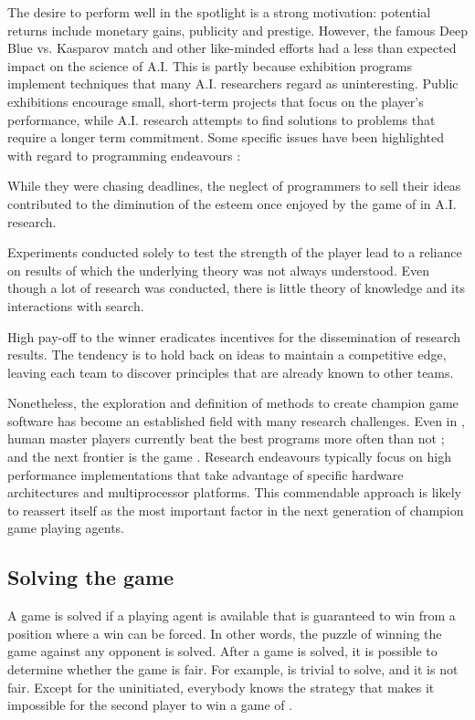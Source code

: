 The desire to perform well in the spotlight is a strong motivation:  potential returns include monetary gains, publicity and prestige. 
However, the famous Deep Blue vs. Kasparov match and other like-minded efforts had a less than expected  impact on the science of A.I.  This is partly because exhibition programs  implement techniques that many A.I. researchers regard as uninteresting.  Public exhibitions encourage small, short-term projects that focus on the player's performance, while A.I. research attempts  to find  solutions to problems that require a longer term commitment.  Some specific issues have been highlighted with regard to  programming endeavours  
\cite{donskoy:grace}:
\begin{mydesclist}
\item While they were chasing deadlines, the neglect of  programmers to sell their ideas contributed to the diminution of the esteem once enjoyed by the game of  in A.I. research.
\item Experiments conducted solely to test the strength of the player lead to a reliance on results of which the underlying theory was not always understood.  Even though a lot of research was conducted, there is little theory of  knowledge and its interactions with search.
\item High pay-off to the winner eradicates incentives for the dissemination of research results.  The tendency is to hold back on ideas to maintain a competitive edge, leaving each team to discover principles that are already known to other teams.
\end{mydesclist}

Nonetheless, the exploration and definition of methods to create champion game software has become an established field with many research challenges. Even in ,  human master players currently beat the best  programs more often than not \cite{sonas:strongest}; and the next frontier is the game . Research endeavours typically focus on high performance implementations that take advantage of specific hardware architectures and multiprocessor platforms. This commendable approach is likely to reassert itself as the most important factor in the next generation of champion game playing agents.

\subsection{Solving the game}
\label{sec:solving}
A game is solved if a playing agent is available that is guaranteed to win from a position where a win can be forced.  In other words, the puzzle of winning the game against any opponent is solved.  After a game is solved, it is possible to determine whether the game is fair.  For example,   is trivial to solve, and it is not fair. Except for the uninitiated, everybody knows the strategy that makes it impossible for the second player to win a game of .

